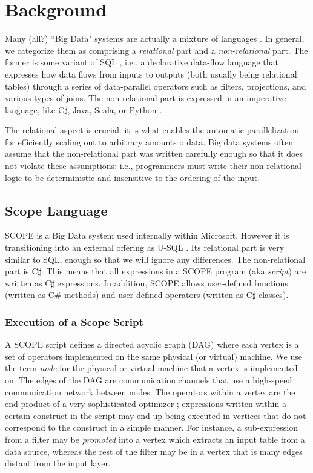 \section{Background}
Many (all?) ``Big Data" systems are actually a mixture of languages \cite{}.
In general, we categorize them as comprising a {\it relational} part and a {\it non-relational} part.
The former is some variant of SQL \cite{}, i.e., a declarative data-flow language that expresses how data flows
from inputs to outputs (both usually being relational tables) through a series of data-parallel operators
such as filters, projections, and various types of joins.
The non-relational part is expressed in an imperative language, like C$\sharp$, Java, Scala, or Python \cite{}.

The relational aspect is crucial: it is what enables the automatic parallelization for efficiently scaling out to
arbitrary amounts o data.
Big data systems often assume that the non-relational part was written carefully enough so that it does not
violate these assumptions: i.e., programmers must write their non-relational logic to be deterministic and insensitive
to the ordering of the input.

\subsection{Scope Language}
SCOPE \cite{} is a Big Data system used internally within Microsoft.
However it is transitioning into an external offering as U-SQL \cite{}.
Its relational part is very similar to SQL, enough so that we will ignore any differences.
The non-relational part is C$\sharp$\cite{}.
This means that all expressions in a SCOPE program (aka {\it script}) are written as C$\sharp$ expressions.
In addition, SCOPE allows user-defined functions (written as C\# methods) and user-defined operators
(written as C$\sharp$ classes).

\subsubsection{Execution of a Scope Script}
A SCOPE script defines a directed acyclic graph (DAG) where each vertex is a set of operators implemented on the
same physical (or virtual) machine. We use the term {\it node} for the physical or virtual machine that a
vertex is implemented on.
The edges of the DAG are communication channels that use a high-speed communication network between nodes.
The operators within a vertex are the end product of a very sophisticated optimizer \cite{}; expressions written
within a certain construct in the script may end up being executed in vertices that do not correspond to the
construct in a simple manner.
For instance, a sub-expression from a filter may be {\it promoted} into a vertex which extracts an input
table from a data source, whereas the rest of the filter may be in a vertex that is many edges distant from
the input layer.


